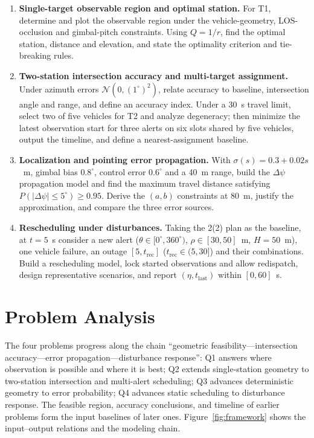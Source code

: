 \begin{enumerate}[label=(\arabic*)]
\item \textbf{Single-target observable region and optimal station.} For T1, determine and plot the observable region under the vehicle-geometry, LOS-occlusion and gimbal-pitch constraints. Using $Q=1/r$, find the optimal station, distance and elevation, and state the optimality criterion and tie-breaking rules.

\item \textbf{Two-station intersection accuracy and multi-target assignment.} Under azimuth errors $\mathcal{N}(0,(1^\circ)^2)$, relate accuracy to baseline, intersection angle and range, and define an accuracy index. Under a 30~s travel limit, select two of five vehicles for T2 and analyze degeneracy; then minimize the latest observation start for three alerts on six slots shared by five vehicles, output the timeline, and define a nearest-assignment baseline.

\item \textbf{Localization and pointing error propagation.} With $\sigma(s)=0.3+0.02s$~m, gimbal bias $0.8^\circ$, control error $0.6^\circ$ and a 40~m range, build the $\Delta\psi$ propagation model and find the maximum travel distance satisfying $P(|\Delta\psi|\le5^\circ)\ge0.95$. Derive the $(a,b)$ constraints at 80~m, justify the approximation, and compare the three error sources.

\item \textbf{Rescheduling under disturbances.} Taking the 2(2) plan as the baseline, at $t=5$~s consider a new alert ($\theta\in[0^\circ,360^\circ)$, $\rho\in[30,50]$~m, $H=50$~m), one vehicle failure, an outage $[5,t_{\mathrm{rec}}]$ ($t_{\mathrm{rec}}\in(5,30]$) and their combinations. Build a rescheduling model, lock started observations and allow redispatch, design representative scenarios, and report $(\eta,t_{\mathrm{last}})$ within $[0,60]$~s.
\end{enumerate}

\section{Problem Analysis}
\label{sec:analysis}

The four problems progress along the chain ``geometric feasibility---intersection accuracy---error propagation---disturbance response'': Q1 answers where observation is possible and where it is best; Q2 extends single-station geometry to two-station intersection and multi-alert scheduling; Q3 advances deterministic geometry to error probability; Q4 advances static scheduling to disturbance response. The feasible region, accuracy conclusions, and timeline of earlier problems form the input baselines of later ones. Figure~\ref{fig:framework} shows the input--output relations and the modeling chain.

